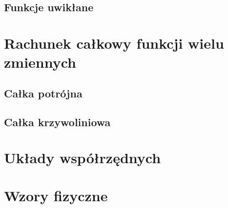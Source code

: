 \documentclass[11pt]{scrartcl}
\begin{document}
        \subsection{Funkcje uwikłane}
        

    \section{Rachunek całkowy funkcji wielu zmiennych}
    
        \subsection{Całka potrójna}
        
        \subsection{Całka krzywoliniowa}
        


    \appendix

    \section{Układy współrzędnych} \label{s:coordinate systems}
    

    \section{Wzory fizyczne} \label{s:physics formulas}
    
\end{document}
